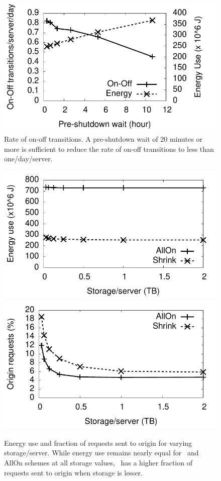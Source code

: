 \begin{figure}[tbp]
\includegraphics[scale=0.55]{energy/graphs/real/g5_onoff/onoff.pdf}
\caption{Rate of on-off transitions. A pre-shutdown wait of 20 minutes or more is sufficient to reduce the rate of on-off transitions to less than one/day/server.}
\end{figure}

\begin{figure}[tbp]
\includegraphics[scale=0.55]{energy/graphs/real/g6_storage/storage-energy.pdf}
\includegraphics[scale=0.55]{energy/graphs/real/g6_storage/storage-missrate.pdf}
\caption{Energy use and fraction of requests sent to origin for varying storage/server. While energy use remains nearly equal for \shrink\ and AllOn schemes at all storage values, \shrink\ has a higher fraction of requests sent to origin when storage is lesser.}
\end{figure}
		


